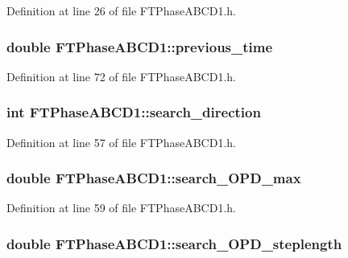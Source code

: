 Definition at line 26 of file FTPhaseABCD1.h.

\hypertarget{classFTPhaseABCD1_a42f5c115652dfc81584d2784f129f714}{
\subsubsection[{previous\_\-time}]{\setlength{\rightskip}{0pt plus 5cm}double {\bf FTPhaseABCD1::previous\_\-time}}}
\label{classFTPhaseABCD1_a42f5c115652dfc81584d2784f129f714}


Definition at line 72 of file FTPhaseABCD1.h.

\hypertarget{classFTPhaseABCD1_a41c864e9da51314cabe1f724a81f3d68}{
\subsubsection[{search\_\-direction}]{\setlength{\rightskip}{0pt plus 5cm}int {\bf FTPhaseABCD1::search\_\-direction}}}
\label{classFTPhaseABCD1_a41c864e9da51314cabe1f724a81f3d68}


Definition at line 57 of file FTPhaseABCD1.h.

\hypertarget{classFTPhaseABCD1_a7a04057b036f5caa88ea6d6e3661e309}{
\subsubsection[{search\_\-OPD\_\-max}]{\setlength{\rightskip}{0pt plus 5cm}double {\bf FTPhaseABCD1::search\_\-OPD\_\-max}}}
\label{classFTPhaseABCD1_a7a04057b036f5caa88ea6d6e3661e309}


Definition at line 59 of file FTPhaseABCD1.h.

\hypertarget{classFTPhaseABCD1_a96dfa4270b568d344a29313dcf36874f}{
\subsubsection[{search\_\-OPD\_\-steplength}]{\setlength{\rightskip}{0pt plus 5cm}double {\bf FTPhaseABCD1::search\_\-OPD\_\-steplength}}}
\label{classFTPhaseABCD1_a96dfa4270b568d344a29313dcf36874f}


